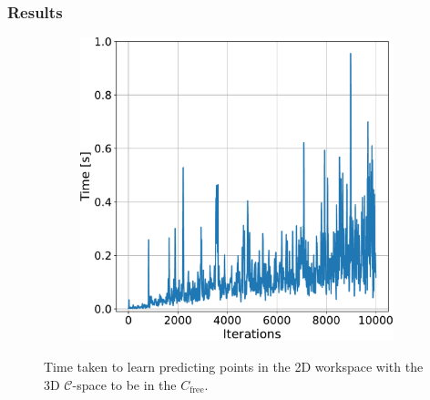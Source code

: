 \documentclass{beamer}
\begin{document}
 
\begin{frame}
	\frametitle{Results}	
	\begin{figure}[!ht]
		\centering  
		\begin{subfigure}[t]{0.49\textwidth}
		  \includegraphics[width=\textwidth]{figChap5/graph_E_2D_learning_time.pdf}   
		   
		\end{subfigure} 
		\caption{Time taken to learn predicting points 
		in the 2D workspace with the 3D $\mathcal{C}$-space
		to be in the \(C_{\text{free}}\).}
		\label{fig:graphs_2D}
	  \end{figure}
\end{frame}	
\end{document}
